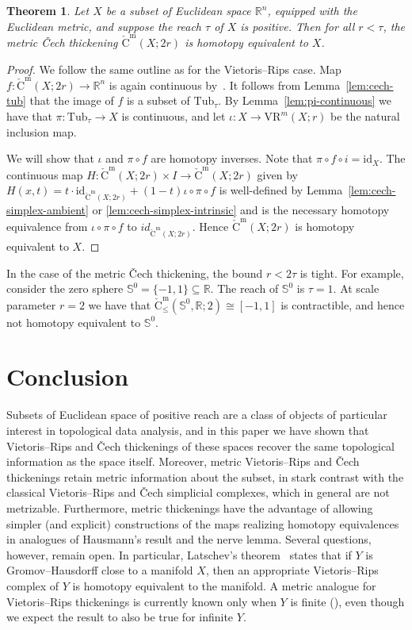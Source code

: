 \documentclass{amsart}
\theoremstyle{plain}
\newtheorem{theorem}[lemma]{Theorem}
\theoremstyle{definition}
\theoremstyle{myremark}
\newcommand{\R}{\mathbb{R}}
\newcommand{\sphere}{\mathbb{S}}
\newcommand{\vrm}[2]{\mathrm{VR}^m(#1;#2)}
\newcommand{\cechm}[2]{\mathrm{\check{C}^m}(#1;#2)}
\newcommand{\cechamleq}[3]{\mathrm{\check{C}_\leq^m}(#1,#2;#3)}
\newcommand{\id}{\mathrm{id}}
\newcommand{\Tub}{\mathrm{Tub}}
\newcommand{\comp}{\circ}
\begin{document}
\begin{theorem}\label{thm:cech}
Let $X$ be a subset of Euclidean space $\R^n$, equipped with the Euclidean metric, and suppose the reach $\tau$ of $X$ is positive. Then for all $r < \tau$, the metric \v{C}ech thickening $\cechm{X}{2r}$ is homotopy equivalent to $X$.
\end{theorem}

\begin{proof}
We follow the same outline as for the Vietoris--Rips case.
Map $f\colon \cechm{X}{2r}\to \R^n$ is again continuous by~\cite[Lemma~5.2]{MetricReconstructionViaOptimalTransport}.
It follows from Lemma~\ref{lem:cech-tub} that the image of $f$ is a subset of $\Tub_\tau$.
By Lemma~\ref{lem:pi-continuous} we have that $\pi \colon \Tub_{\tau} \to X$ is continuous, and let $\iota \colon X \rightarrow \vrm{X}{r}$ be the natural inclusion map.

We will show that $\iota$ and $\pi \circ f$ are homotopy inverses.
Note that $\pi \comp f \comp i = \id_{X}$.
The continuous map $H \colon \cechm{X}{2r} \times I \to \cechm{X}{2r}$ given by $H(x,t) = t\cdot\id_{\cechm{X}{2r}}+(1-t)\iota\comp\pi\comp f$ is well-defined by Lemma~\ref{lem:cech-simplex-ambient} or \ref{lem:cech-simplex-intrinsic} and is the necessary homotopy equivalence from $\iota \circ \pi \circ f$ to $id_{\cechm{X}{2r}}$. Hence $\cechm{X}{2r}$ is homotopy equivalent to $X$.
\end{proof}

In the case of the metric \v{C}ech thickening, the bound $r < 2\tau$ is tight.
For example, consider the zero sphere $\sphere^0 = \{-1,1\} \subseteq \R$.
The reach of $\sphere^0$ is $\tau = 1$.
At scale parameter $r = 2$ we have that $\cechamleq{\sphere^0}{\R}{2} \cong [-1,1]$ is contractible, and hence not homotopy equivalent to $\sphere^0$.

\section{Conclusion}\label{sec:conclusion}
Subsets of Euclidean space of positive reach are a class of objects of particular interest in topological data analysis, and in this paper we have shown that Vietoris--Rips and \v{C}ech thickenings of these spaces recover the same topological information as the space itself.
Moreover, metric Vietoris--Rips and \v{C}ech thickenings retain metric information about the subset, in stark contrast with the classical Vietoris--Rips and \v{C}ech simplicial complexes, which in general are not metrizable.
Furthermore, metric thickenings have the advantage of allowing simpler (and explicit) constructions of the maps realizing homotopy equivalences in analogues of Hausmann's result and the nerve lemma.
Several questions, however, remain open.
In particular, Latschev's theorem~\cite{Latschev} states that if $Y$ is Gromov--Hausdorff close to a manifold $X$, then an appropriate Vietoris--Rips complex of $Y$ is homotopy equivalent to the manifold. A metric analogue for Vietoris--Rips thickenings is currently known only when $Y$ is finite (\cite[Theorem~4.4]{MetricReconstructionViaOptimalTransport}), even though we expect the result to also be true for infinite $Y$.



\end{document}
